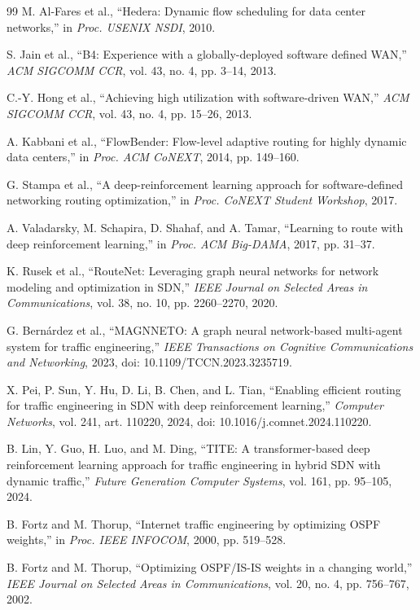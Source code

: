 \documentclass[12pt,a4paper,oneside]{report}
\begin{document}
\begin{thebibliography}{99}
M. Al-Fares et al., ``Hedera: Dynamic flow scheduling for data center networks,'' in \emph{Proc. USENIX NSDI}, 2010.

S. Jain et al., ``B4: Experience with a globally-deployed software defined WAN,'' \emph{ACM SIGCOMM CCR}, vol. 43, no. 4, pp. 3--14, 2013.

C.-Y. Hong et al., ``Achieving high utilization with software-driven WAN,'' \emph{ACM SIGCOMM CCR}, vol. 43, no. 4, pp. 15--26, 2013.

A. Kabbani et al., ``FlowBender: Flow-level adaptive routing for highly dynamic data centers,'' in \emph{Proc. ACM CoNEXT}, 2014, pp. 149--160.

G. Stampa et al., ``A deep-reinforcement learning approach for software-defined networking routing optimization,'' in \emph{Proc. CoNEXT Student Workshop}, 2017.

A. Valadarsky, M. Schapira, D. Shahaf, and A. Tamar, ``Learning to route with deep reinforcement learning,'' in \emph{Proc. ACM Big-DAMA}, 2017, pp. 31--37.

K. Rusek et al., ``RouteNet: Leveraging graph neural networks for network modeling and optimization in SDN,'' \emph{IEEE Journal on Selected Areas in Communications}, vol. 38, no. 10, pp. 2260--2270, 2020.

G. Bernárdez et al., ``MAGNNETO: A graph neural network-based multi-agent system for traffic engineering,'' \emph{IEEE Transactions on Cognitive Communications and Networking}, 2023, doi: 10.1109/TCCN.2023.3235719.

X. Pei, P. Sun, Y. Hu, D. Li, B. Chen, and L. Tian, ``Enabling efficient routing for traffic engineering in SDN with deep reinforcement learning,'' \emph{Computer Networks}, vol. 241, art. 110220, 2024, doi: 10.1016/j.comnet.2024.110220.

B. Lin, Y. Guo, H. Luo, and M. Ding, ``TITE: A transformer-based deep reinforcement learning approach for traffic engineering in hybrid SDN with dynamic traffic,'' \emph{Future Generation Computer Systems}, vol. 161, pp. 95--105, 2024.

B. Fortz and M. Thorup, ``Internet traffic engineering by optimizing OSPF weights,'' in \emph{Proc. IEEE INFOCOM}, 2000, pp. 519--528.

B. Fortz and M. Thorup, ``Optimizing OSPF/IS-IS weights in a changing world,'' \emph{IEEE Journal on Selected Areas in Communications}, vol. 20, no. 4, pp. 756--767, 2002.

\end{thebibliography}
\end{document}
